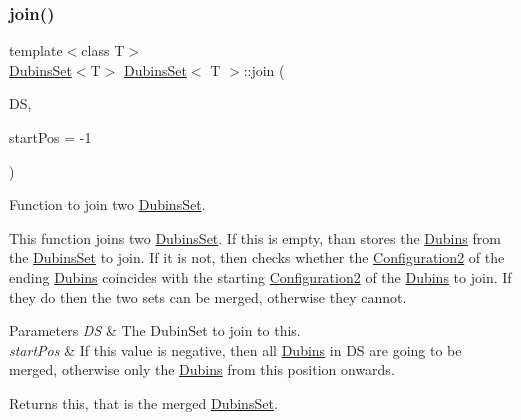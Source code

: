 \subsubsection{\texorpdfstring{join()}{join()}}
{\footnotesize\ttfamily template$<$class T$>$ \\
\mbox{\hyperlink{class_dubins_set}{Dubins\+Set}}$<$T$>$ \mbox{\hyperlink{class_dubins_set}{Dubins\+Set}}$<$ T $>$\+::join (\begin{DoxyParamCaption}\item[{\mbox{\hyperlink{class_dubins_set}{Dubins\+Set}}$<$ T $>$ $\ast$}]{DS,  }\item[{\mbox{\hyperlink{draw_8hh_aa620a13339ac3a1177c86edc549fda9b}{int}}}]{start\+Pos = {\ttfamily -\/1} }\end{DoxyParamCaption})\hspace{0.3cm}{\ttfamily [inline]}}



Function to join two \mbox{\hyperlink{class_dubins_set}{Dubins\+Set}}. 

This function joins two \mbox{\hyperlink{class_dubins_set}{Dubins\+Set}}. If {\ttfamily this} is empty, than stores the {\ttfamily \mbox{\hyperlink{class_dubins}{Dubins}}} from the {\ttfamily \mbox{\hyperlink{class_dubins_set}{Dubins\+Set}}} to join. If it is not, then checks whether the {\ttfamily \mbox{\hyperlink{class_configuration2}{Configuration2}}} of the ending {\ttfamily \mbox{\hyperlink{class_dubins}{Dubins}}} coincides with the starting {\ttfamily \mbox{\hyperlink{class_configuration2}{Configuration2}}} of the {\ttfamily \mbox{\hyperlink{class_dubins}{Dubins}}} to join. If they do then the two sets can be merged, otherwise they cannot. 
\begin{DoxyParams}{Parameters}
{\em DS} & The {\ttfamily Dubin\+Set} to join to {\ttfamily this}. \\
\hline
{\em start\+Pos} & If this value is negative, then all {\ttfamily \mbox{\hyperlink{class_dubins}{Dubins}}} in DS are going to be merged, otherwise only the {\ttfamily \mbox{\hyperlink{class_dubins}{Dubins}}} from this position onwards. \\
\hline
\end{DoxyParams}
\begin{DoxyReturn}{Returns}
{\ttfamily this}, that is the merged {\ttfamily \mbox{\hyperlink{class_dubins_set}{Dubins\+Set}}}. 
\end{DoxyReturn}
\mbox{\label{class_dubins_set_a72235c9cfc00e200b8a7fdf5efb4c126}} 
